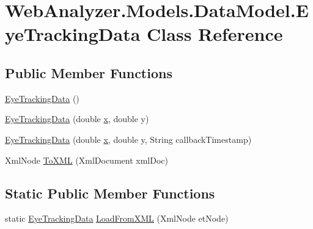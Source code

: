 \hypertarget{class_web_analyzer_1_1_models_1_1_data_model_1_1_eye_tracking_data}{}\section{Web\+Analyzer.\+Models.\+Data\+Model.\+Eye\+Tracking\+Data Class Reference}
\label{class_web_analyzer_1_1_models_1_1_data_model_1_1_eye_tracking_data}
\subsection*{Public Member Functions}
\begin{DoxyCompactItemize}
\item 
\hyperlink{class_web_analyzer_1_1_models_1_1_data_model_1_1_eye_tracking_data_a019976267c787cca233fa585617604a9}{Eye\+Tracking\+Data} ()
\item 
\hyperlink{class_web_analyzer_1_1_models_1_1_data_model_1_1_eye_tracking_data_a70772188385fd52208012f521b681587}{Eye\+Tracking\+Data} (double \hyperlink{_u_i_2_h_t_m_l_resources_2js_2lib_2underscore_8min_8js_a81e910173af87b1161e719a504d52407}{x}, double y)
\item 
\hyperlink{class_web_analyzer_1_1_models_1_1_data_model_1_1_eye_tracking_data_ab19e82540642c30ffdcc165b614f1484}{Eye\+Tracking\+Data} (double \hyperlink{_u_i_2_h_t_m_l_resources_2js_2lib_2underscore_8min_8js_a81e910173af87b1161e719a504d52407}{x}, double y, String callback\+Timestamp)
\item 
Xml\+Node \hyperlink{class_web_analyzer_1_1_models_1_1_data_model_1_1_eye_tracking_data_a540c4152cbb783ed5a4bf9c4568689e0}{To\+X\+M\+L} (Xml\+Document xml\+Doc)
\end{DoxyCompactItemize}
\subsection*{Static Public Member Functions}
\begin{DoxyCompactItemize}
\item 
static \hyperlink{class_web_analyzer_1_1_models_1_1_data_model_1_1_eye_tracking_data}{Eye\+Tracking\+Data} \hyperlink{class_web_analyzer_1_1_models_1_1_data_model_1_1_eye_tracking_data_a8b4193887c838834858386d84b2cbc1b}{Load\+From\+X\+M\+L} (Xml\+Node et\+Node)
\end{DoxyCompactItemize}
